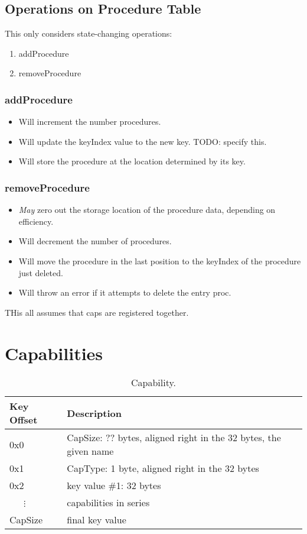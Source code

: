 \documentclass[english,a4paper]{article}
\let\oldparagraph\subsubsection
\renewcommand{\subsubsection}[1]{\oldparagraph{#1}\mbox{}}
\begin{document}
\subsection{Operations on Procedure Table}
This only considers state-changing operations:

\begin{enumerate}
  \item addProcedure
  \item removeProcedure
\end{enumerate}

\subsubsection{addProcedure}
\begin{itemize}
  \item Will increment the number procedures.
  \item Will update the keyIndex value to the new key. TODO: specify this.
  \item Will store the procedure at the location determined by its key.
\end{itemize}

\subsubsection{removeProcedure}
\begin{itemize}
  \item \emph{May} zero out the storage location of the procedure data,
  depending on efficiency.
  \item Will decrement the number of procedures.
  \item Will move the procedure in the last position to the keyIndex of the
  procedure just deleted.
  \item Will throw an error if it attempts to delete the entry proc.
\end{itemize}

THis all assumes that caps are registered together.

\section{Capabilities}\label{capabilities}
\begin{table}[H]
  \caption{Capability.}
  \centering{}%
  \begin{tabular}{l|p{}}
    \hline
    Key Offset & Description\tabularnewline
    \hline
    \hline
    0x0       & CapSize: ?? bytes, aligned right in the 32 bytes, the given
      name \tabularnewline
    0x1       & CapType: 1 byte, aligned right in the 32 bytes \tabularnewline
    0x2       & key value \#1: 32 bytes \tabularnewline
    ~~~$\vdots$ & capabilities in series \tabularnewline
    CapSize & final key value \tabularnewline
    \hline
  \end{tabular}
\end{table}
\end{document}
